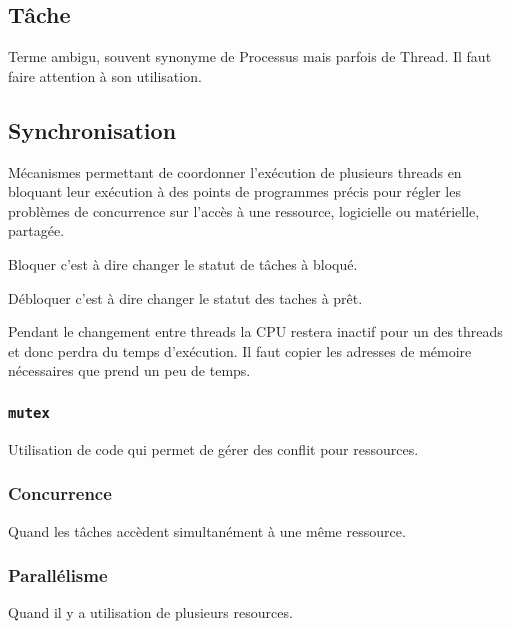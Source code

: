 \documentclass{article}
\begin{document}
\subsection{Tâche}
\begin{definition}
    Terme ambigu, souvent synonyme de Processus mais parfois de Thread. Il faut faire attention à son utilisation.
\end{definition}


\subsection{Synchronisation}
\begin{definition}
    Mécanismes permettant de coordonner l'exécution de plusieurs threads en bloquant leur exécution à des points de programmes précis pour régler les problèmes de concurrence sur l'accès à une ressource, logicielle ou matérielle, partagée.

    \begin{remark}
        Bloquer c'est à dire changer le statut de tâches à bloqué.
    \end{remark}
    \begin{remark}
        Débloquer c'est à dire changer le statut des taches à prêt.
    \end{remark}

    Pendant le changement entre threads la CPU restera inactif pour un des threads et donc perdra du temps d'exécution. Il faut copier les adresses de mémoire nécessaires que prend un peu de temps.
\end{definition}

\subsubsection{\texttt{mutex}}
\begin{definition}
    Utilisation de code qui permet de gérer des conflit pour ressources. 
\end{definition}

\subsubsection{Concurrence}
\begin{definition}
    Quand les tâches accèdent simultanément à une même ressource.
\end{definition}

\subsubsection{Parallélisme}
\begin{definition}
    Quand il y a utilisation de plusieurs resources.
\end{definition}
\end{document}
